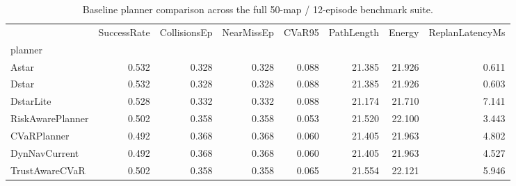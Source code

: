 \begin{table}
\caption{Baseline planner comparison across the full 50-map / 12-episode benchmark suite.}
\label{tab:baseline}
\begin{tabular}{lrrrrrrr}
\toprule
 & SuccessRate & CollisionsEp & NearMissEp & CVaR95 & PathLength & Energy & ReplanLatencyMs \\
planner &  &  &  &  &  &  &  \\
\midrule
Astar & 0.532 & 0.328 & 0.328 & 0.088 & 21.385 & 21.926 & 0.611 \\
Dstar & 0.532 & 0.328 & 0.328 & 0.088 & 21.385 & 21.926 & 0.603 \\
DstarLite & 0.528 & 0.332 & 0.332 & 0.088 & 21.174 & 21.710 & 7.141 \\
RiskAwarePlanner & 0.502 & 0.358 & 0.358 & 0.053 & 21.520 & 22.100 & 3.443 \\
CVaRPlanner & 0.492 & 0.368 & 0.368 & 0.060 & 21.405 & 21.963 & 4.802 \\
DynNavCurrent & 0.492 & 0.368 & 0.368 & 0.060 & 21.405 & 21.963 & 4.527 \\
TrustAwareCVaR & 0.502 & 0.358 & 0.358 & 0.065 & 21.554 & 22.121 & 5.946 \\
\bottomrule
\end{tabular}
\end{table}
